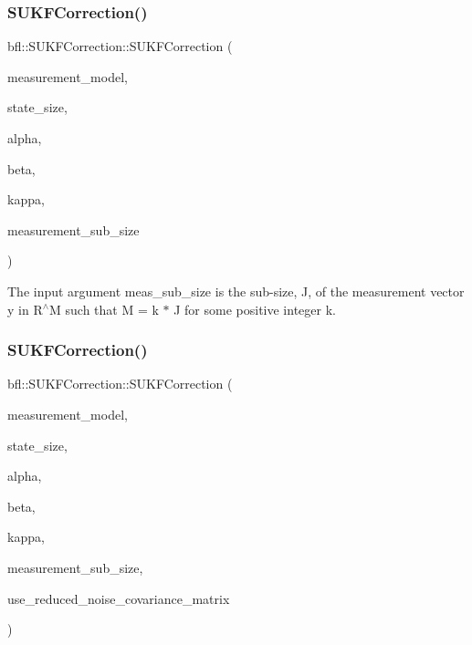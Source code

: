 \subsubsection{\texorpdfstring{S\+U\+K\+F\+Correction()}{SUKFCorrection()}\hspace{0.1cm}{\footnotesize\ttfamily [1/3]}}
{\footnotesize\ttfamily bfl\+::\+S\+U\+K\+F\+Correction\+::\+S\+U\+K\+F\+Correction (\begin{DoxyParamCaption}\item[{std\+::unique\+\_\+ptr$<$ \mbox{\hyperlink{classbfl_1_1AdditiveMeasurementModel}{Additive\+Measurement\+Model}} $>$}]{measurement\+\_\+model,  }\item[{const std\+::size\+\_\+t}]{state\+\_\+size,  }\item[{const double}]{alpha,  }\item[{const double}]{beta,  }\item[{const double}]{kappa,  }\item[{const std\+::size\+\_\+t}]{measurement\+\_\+sub\+\_\+size }\end{DoxyParamCaption})\hspace{0.3cm}{\ttfamily [noexcept]}}



The input argument meas\+\_\+sub\+\_\+size is the sub-\/size, J, of the measurement vector y in R$^\wedge$M such that M = k $\ast$ J for some positive integer k. 

\mbox{\label{classbfl_1_1SUKFCorrection_a9ac13d8bd68f7847b67cc3226907c169}} 
\subsubsection{\texorpdfstring{S\+U\+K\+F\+Correction()}{SUKFCorrection()}\hspace{0.1cm}{\footnotesize\ttfamily [2/3]}}
{\footnotesize\ttfamily bfl\+::\+S\+U\+K\+F\+Correction\+::\+S\+U\+K\+F\+Correction (\begin{DoxyParamCaption}\item[{std\+::unique\+\_\+ptr$<$ \mbox{\hyperlink{classbfl_1_1AdditiveMeasurementModel}{Additive\+Measurement\+Model}} $>$}]{measurement\+\_\+model,  }\item[{const std\+::size\+\_\+t}]{state\+\_\+size,  }\item[{const double}]{alpha,  }\item[{const double}]{beta,  }\item[{const double}]{kappa,  }\item[{const std\+::size\+\_\+t}]{measurement\+\_\+sub\+\_\+size,  }\item[{const bool}]{use\+\_\+reduced\+\_\+noise\+\_\+covariance\+\_\+matrix }\end{DoxyParamCaption})\hspace{0.3cm}{\ttfamily [noexcept]}}



